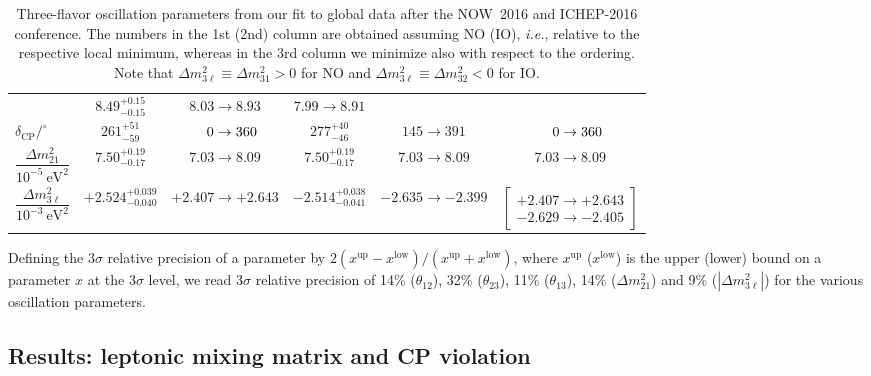 \documentclass[a4paper, 11pt]{article}
\newcommand{\Dmq}{\Delta m^2}
\newcommand{\eVq}{\ensuremath{\text{eV}^2}}
\begin{document}
\begin{table}
\begin{footnotesize}
\begin{tabular}{l|cc|cc|c}
      & $8.49_{-0.15}^{+0.15}$ & $8.03 \to 8.93$
      & $7.99 \to 8.91$
      \\[3mm]
      $\delta_\text{CP}/^\circ$
      & $261_{-59}^{+51}$ & $\hphantom{00}0 \to 360$
      & $277_{-46}^{+40}$ & $145 \to 391$
      & $\hphantom{00}0 \to 360$
      \\[3mm]
      $\dfrac{\Dmq_{21}}{10^{-5}~\eVq}$
      & $7.50_{-0.17}^{+0.19}$ & $7.03 \to 8.09$
      & $7.50_{-0.17}^{+0.19}$ & $7.03 \to 8.09$
      & $7.03 \to 8.09$
      \\[3mm]
      $\dfrac{\Dmq_{3\ell}}{10^{-3}~\eVq}$
      & $+2.524_{-0.040}^{+0.039}$ & $+2.407 \to +2.643$
      & $-2.514_{-0.041}^{+0.038}$ & $-2.635 \to -2.399$
      & $\begin{bmatrix}
        +2.407 \to +2.643\\[-2pt]
        -2.629 \to -2.405
      \end{bmatrix}$
      \\[3mm]
      \hline\hline
    \end{tabular}
  \end{footnotesize}
  \caption{Three-flavor oscillation parameters from our fit to global
    data after the NOW~2016 and ICHEP-2016 conference.  The numbers in
    the 1st (2nd) column are obtained assuming NO (IO), \textit{i.e.},
    relative to the respective local minimum, whereas in the 3rd
    column we minimize also with respect to the ordering. Note that
    $\Dmq_{3\ell} \equiv \Dmq_{31} > 0$ for NO and $\Dmq_{3\ell}
    \equiv \Dmq_{32} < 0$ for IO.}
  \label{tab:bfranges}
\end{table}

Defining the $3\sigma$ relative precision of a parameter by
$2(x^\text{up} - x^\text{low}) / (x^\text{up} + x^\text{low})$, where
$x^\text{up}$ ($x^\text{low}$) is the upper (lower) bound on a
parameter $x$ at the $3\sigma$ level, we read $3\sigma$ relative
precision of 14\% ($\theta_{12}$), 32\% ($\theta_{23}$), 11\%
($\theta_{13}$), 14\% ($\Dmq_{21}$) and 9\% ($|\Dmq_{3\ell}|$) for the
various oscillation parameters.

\subsection{Results: leptonic mixing matrix and CP violation}
\label{subsec:CP}
\end{document}
